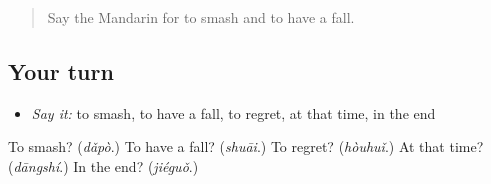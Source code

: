 \label{lesson:ZH-R187-review-final-187}



\begin{quote}
Say the Mandarin for to smash and to have a fall.
\end{quote}

\subsection*{Your turn}
\begin{itemize}
\raggedright
  \item \emph{Say it:} to smash, to have a fall, to regret, at that time, in the end
\end{itemize}

\begin{tcolorbox}[breakable,colback=teal!4,colframe=teal!35!black,title={Before you move on}]
To smash? (\emph{dǎpò}.) To have a fall? (\emph{shuāi}.) To regret? (\emph{hòuhuǐ}.) At that time? (\emph{dāngshí}.) In the end? (\emph{jiéguǒ}.)
\end{tcolorbox}
